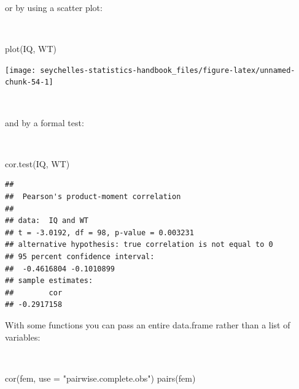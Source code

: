 \documentclass[
  12pt,
]{book}
\newenvironment{Shaded}{\begin{snugshade}}{\end{snugshade}}
\newcommand{\AttributeTok}[1]{\textcolor[rgb]{0.77,0.63,0.00}{#1}}
\newcommand{\FunctionTok}[1]{\textcolor[rgb]{0.00,0.00,0.00}{#1}}
\newcommand{\NormalTok}[1]{#1}
\newcommand{\StringTok}[1]{\textcolor[rgb]{0.31,0.60,0.02}{#1}}
\begin{document}
\newpage

or by using a scatter plot:

~

\begin{Shaded}
\begin{Highlighting}[]
\FunctionTok{plot}\NormalTok{(IQ, WT)}
\end{Highlighting}
\end{Shaded}

\begin{center}\texttt{[image: seychelles-statistics-handbook\_files/figure-latex/unnamed-chunk-54-1]} \end{center}

~

and by a formal test:

~

\begin{Shaded}
\begin{Highlighting}[]
\FunctionTok{cor.test}\NormalTok{(IQ, WT)}
\end{Highlighting}
\end{Shaded}

\begin{verbatim}
## 
##  Pearson's product-moment correlation
## 
## data:  IQ and WT
## t = -3.0192, df = 98, p-value = 0.003231
## alternative hypothesis: true correlation is not equal to 0
## 95 percent confidence interval:
##  -0.4616804 -0.1010899
## sample estimates:
##        cor 
## -0.2917158
\end{verbatim}

\newpage

With some functions you can pass an entire data.frame rather than a list of variables:

~

\begin{Shaded}
\begin{Highlighting}[]
\FunctionTok{cor}\NormalTok{(fem, }\AttributeTok{use =} \StringTok{"pairwise.complete.obs"}\NormalTok{)}
\FunctionTok{pairs}\NormalTok{(fem)}
\end{Highlighting}
\end{Shaded}
\end{document}
